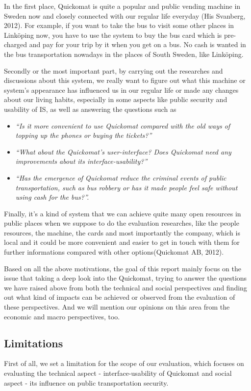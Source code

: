 \documentclass[twocolumn]{article}
\begin{document}
In the first place, Quickomat is quite a popular and public vending machine in Sweden now and closely connected with our regular life everyday (His Svanberg, 2012). For example, if you want to take the bus to visit some other places in Linköping now, you have to use the system to buy the bus card which is pre-charged and pay for your trip by it when you get on a bus. No cash is wanted in the bus transportation nowadays in the places of South Sweden, like Linköping.

Secondly or the most important part, by carrying out the researches and discussions about this system, we really want to figure out what this machine or system’s appearance has influenced us in our regular life or made any changes about our living habits, especially in some aspects like public security and usability of IS, as well as answering the questions such as
\begin{itemize}
  \item \emph{“Is it more convenient to use Quickomat compared with the old ways of topping up the phones or buying the tickets?”}
  \item \emph{“What about the Quickomat's user-interface? Does Quickomat need any improvements  about its interface-usability?”}
  \item \emph{“Has the emergence of Quickomat reduce the criminal events of public transportation, such as bus robbery or has it made people feel safe without using cash for the bus?”.}
\end{itemize}

Finally, it’s a kind of system that we can achieve quite many open resources in public places when we suppose to do the evaluation researches, like the people resources, the machine, the cards and most importantly the company, which is local and it could be more convenient and easier to get in touch with them for further informations compared with other options(Quickomat AB, 2012). 

Based on all the above motivations, the goal of this report mainly focus on the issue that taking a deep look into the Quickomat, trying to answer the questions we have raised above from both the technical and social perspectives and finding out what kind of impacts can be achieved or observed from the evaluation of these perspectives. And we will mention our opinions on this area from the economic and macro perspectives, too.

\subsection{Limitations}
First of all, we set a limitation for the scope of our evaluation, which focuses on evaluating the technical aspect - interface-usability of Quickomat and social aspect - its influence on public transportation security. 
\end{document}
